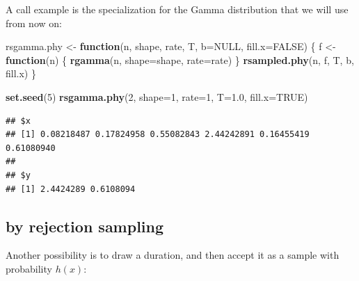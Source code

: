 \documentclass[]{article}
\newenvironment{Shaded}{\begin{snugshade}}{\end{snugshade}}
\newcommand{\ControlFlowTok}[1]{\textcolor[rgb]{0.13,0.29,0.53}{\textbf{#1}}}
\newcommand{\DataTypeTok}[1]{\textcolor[rgb]{0.13,0.29,0.53}{#1}}
\newcommand{\DecValTok}[1]{\textcolor[rgb]{0.00,0.00,0.81}{#1}}
\newcommand{\FloatTok}[1]{\textcolor[rgb]{0.00,0.00,0.81}{#1}}
\newcommand{\KeywordTok}[1]{\textcolor[rgb]{0.13,0.29,0.53}{\textbf{#1}}}
\newcommand{\NormalTok}[1]{#1}
\newcommand{\OtherTok}[1]{\textcolor[rgb]{0.56,0.35,0.01}{#1}}
\newcommand{\StringTok}[1]{\textcolor[rgb]{0.31,0.60,0.02}{#1}}
\begin{document}
A call example is the specialization for the Gamma distribution that we
will use from now on:

\begin{Shaded}
\begin{Highlighting}[]
\NormalTok{rsgamma.phy <-}\StringTok{ }\ControlFlowTok{function}\NormalTok{(n, shape, rate, T, }\DataTypeTok{b=}\OtherTok{NULL}\NormalTok{, }\DataTypeTok{fill.x=}\OtherTok{FALSE}\NormalTok{) \{}
\NormalTok{  f <-}\StringTok{ }\ControlFlowTok{function}\NormalTok{(n) \{}
    \KeywordTok{rgamma}\NormalTok{(n, }\DataTypeTok{shape=}\NormalTok{shape, }\DataTypeTok{rate=}\NormalTok{rate)}
\NormalTok{  \}}
  \KeywordTok{rsampled.phy}\NormalTok{(n, f, T, b, fill.x)}
\NormalTok{\}}

\KeywordTok{set.seed}\NormalTok{(}\DecValTok{5}\NormalTok{)}
\KeywordTok{rsgamma.phy}\NormalTok{(}\DecValTok{2}\NormalTok{, }\DataTypeTok{shape=}\DecValTok{1}\NormalTok{, }\DataTypeTok{rate=}\DecValTok{1}\NormalTok{, }\DataTypeTok{T=}\FloatTok{1.0}\NormalTok{, }\DataTypeTok{fill.x=}\OtherTok{TRUE}\NormalTok{)}
\end{Highlighting}
\end{Shaded}

\begin{verbatim}
## $x
## [1] 0.08218487 0.17824958 0.55082843 2.44242891 0.16455419 0.61080940
## 
## $y
## [1] 2.4424289 0.6108094
\end{verbatim}

\hypertarget{by-rejection-sampling}{%
\subsection{by rejection sampling}\label{by-rejection-sampling}}

Another possibility is to draw a duration, and then accept it as a
sample with probability \(h(x)\):
\end{document}
